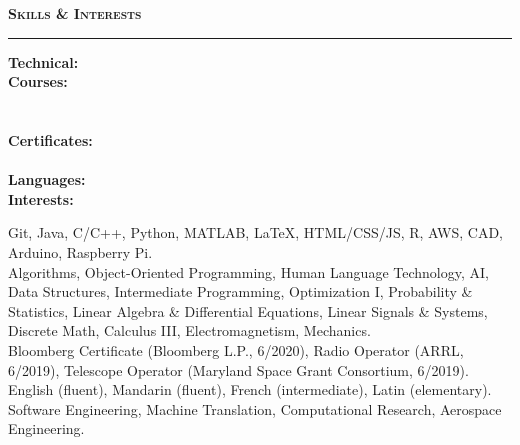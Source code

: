 \documentclass[10pt, letterpaper]{article}
\begin{document}
{\large \textbf{\textsc{Skills \& Interests}}}
\vspace{5pt}
\hrule
{}
\begin{paracol}{2}
\raggedleft
\textbf{Technical:}\\
\textbf{Courses:}\\~\\~\\
\textbf{Certificates:}\\~\\
\textbf{Languages:}\\
\textbf{Interests:}\\
\switchcolumn
\raggedright
Git, Java, C/C++, Python, MATLAB, \LaTeX, HTML/CSS/JS, R, AWS, CAD, Arduino, Raspberry Pi.\\
Algorithms, Object-Oriented Programming, Human Language Technology, AI, Data Structures, Intermediate Programming, Optimization I, Probability \& Statistics, Linear Algebra \& Differential Equations, Linear Signals \& Systems, Discrete Math, Calculus III, Electromagnetism, Mechanics.\\
Bloomberg Certificate (Bloomberg L.P., 6/2020), Radio Operator (ARRL, 6/2019), Telescope Operator (Maryland Space Grant Consortium, 6/2019).\\
English (fluent), Mandarin (fluent), French (intermediate), Latin (elementary).\\
Software Engineering, Machine Translation, Computational Research, Aerospace Engineering.\\
\end{paracol}
\end{document}
